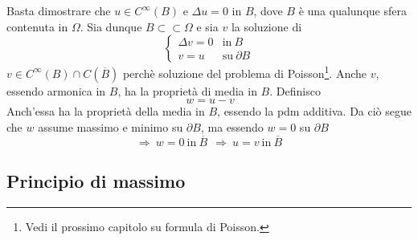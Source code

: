 \documentclass[10pt,a4paper,twoside,openright]{book}
\begin{document}
\begin{dimostrazione}
	Basta dimostrare che $\displaystyle u\in C^{\infty }(B)$ e $\displaystyle \Delta u=0$ in $\displaystyle B$, dove $\displaystyle B$ è una qualunque sfera contenuta in $\displaystyle \Omega $. Sia dunque $\displaystyle B\subset \subset \Omega $ e sia $\displaystyle v$ la soluzione di 
	\begin{equation*}
		\begin{cases}
			\Delta v=0 & \text{in} \ B          \\
			v=u        & \text{su} \ \partial B 
		\end{cases}
	\end{equation*}
	$\displaystyle v\in C^{\infty }(B) \cap C(\overline{B})$ perchè soluzione del problema di Poisson\footnote{Vedi il prossimo capitolo su formula di Poisson.}. Anche $\displaystyle v$, essendo armonica in $\displaystyle B$, ha la proprietà di media in $\displaystyle B$. Definisco
	\begin{equation*}
		\ w=u-v
	\end{equation*}
	Anch'essa ha la proprietà della media in $\displaystyle B$, essendo la pdm additiva. Da ciò segue che $\displaystyle w$ assume massimo e minimo su $\displaystyle \partial B$, ma essendo $\displaystyle w=0$ su $\displaystyle \partial B$
	\begin{equation*}
		\Rightarrow \ w=0\ \text{in} \ \overline{B} \ \ \Rightarrow \ u=v\ \text{in} \ \overline{B}
	\end{equation*}
\end{dimostrazione}
\subsection{Principio di massimo}
\end{document}

